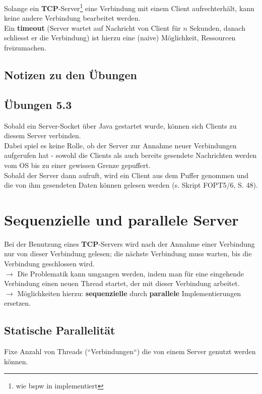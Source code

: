 \noindent
Solange ein \textbf{TCP}-Server\footnote{
 wie bspw in \cite[288, Listing 5.8]{Oec22} implementiert
} eine Verbindung mit einem Client aufrechterhält, kann keine andere Verbindung bearbeitet werden.\\
Ein \textbf{timeout} (Server wartet auf Nachricht von Client für $n$ Sekunden, danach schliesst er die Verbindung) ist hierzu eine (naive) Möglichkeit, Ressourcen freizumachen.

\subsection{Notizen zu den Übungen}
\subsection*{Übungen 5.3}
Sobald ein Server-Socket über Java gestartet wurde, können sich Clients zu diesem Server verbinden.\\
Dabei spiel es keine Rolle, ob der Server  zur Annahme neuer Verbindungen aufgerufen hat - sowohl die Clients als auch bereits gesendete Nachrichten werden vom OS bis zu einer gewissen Grenze gepuffert.\\
Sobald der Server dann  aufruft, wird ein Client aus dem Puffer genommen und die von ihm gesendeten Daten können gelesen werden (s. Skript FOPT5/6, S. 48).

\section{Sequenzielle und parallele Server}\label{sec:seqparserver}

Bei der Benutzung eines \textbf{TCP}-Servers wird nach der Annahme einer Verbindung nur von dieser Verbindung gelesen; die nächste Verbindung muss warten, bis die Verbindung geschlossen wird.\\
$\rightarrow$ Die Problematik kann umgangen werden, indem man für eine eingehende Verbindung einen neuen Thread startet, der mit dieser Verbindung arbeitet.\\

\noindent
$\rightarrow$ Möglichkeiten hierzu: \textbf{sequenzielle} durch \textbf{parallele} Implementierungen ersetzen.\\

\subsection*{Statische Parallelität}
Fixe Anzahl von Threads (``Verbindungen``) die von einem Server genutzt werden können.\\

